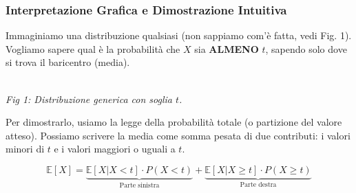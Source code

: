 \subsubsection{Interpretazione Grafica e Dimostrazione Intuitiva}

Immaginiamo una distribuzione qualsiasi (non sappiamo com'è fatta, vedi Fig. 1). Vogliamo sapere qual è la probabilità che $X$ sia \textbf{ALMENO} $t$, sapendo solo dove si trova il baricentro (media).

\begin{center}
\\ \textit{Fig 1: Distribuzione generica con soglia $t$.}
\end{center}

Per dimostrarlo, usiamo la legge della probabilità totale (o partizione del valore atteso). Possiamo scrivere la media come somma pesata di due contributi: i valori minori di $t$ e i valori maggiori o uguali a $t$.

\begin{equation}
\mathbb{E}[X] = \underbrace{\mathbb{E}[X | X < t] \cdot P(X < t)}_{\text{Parte sinistra}} + \underbrace{\mathbb{E}[X | X \ge t] \cdot P(X \ge t)}_{\text{Parte destra}}
\end{equation}

